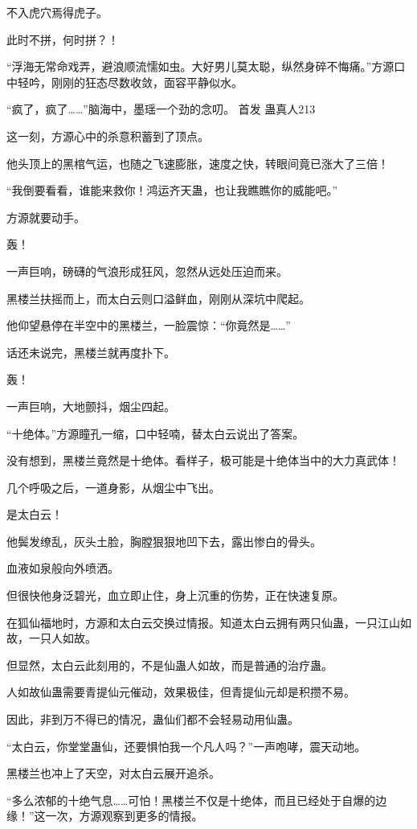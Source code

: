 \begin{this_body}
不入虎穴焉得虎子。

此时不拼，何时拼？！

“浮海无常命戏弄，避浪顺流懦如虫。大好男儿莫太聪，纵然身碎不悔痛。”方源口中轻吟，刚刚的狂态尽数收敛，面容平静似水。

“疯了，疯了……”脑海中，墨瑶一个劲的念叨。  首发 蛊真人213

这一刻，方源心中的杀意积蓄到了顶点。

他头顶上的黑棺气运，也随之飞速膨胀，速度之快，转眼间竟已涨大了三倍！

“我倒要看看，谁能来救你！鸿运齐天蛊，也让我瞧瞧你的威能吧。”

方源就要动手。

轰！

一声巨响，磅礴的气浪形成狂风，忽然从远处压迫而来。

黑楼兰扶摇而上，而太白云则口溢鲜血，刚刚从深坑中爬起。

他仰望悬停在半空中的黑楼兰，一脸震惊：“你竟然是……”

话还未说完，黑楼兰就再度扑下。

轰！

一声巨响，大地颤抖，烟尘四起。

“十绝体。”方源瞳孔一缩，口中轻喃，替太白云说出了答案。

没有想到，黑楼兰竟然是十绝体。看样子，极可能是十绝体当中的大力真武体！

几个呼吸之后，一道身影，从烟尘中飞出。

是太白云！

他鬓发缭乱，灰头土脸，胸膛狠狠地凹下去，露出惨白的骨头。

血液如泉般向外喷洒。

但很快他身泛碧光，血立即止住，身上沉重的伤势，正在快速复原。

在狐仙福地时，方源和太白云交换过情报。知道太白云拥有两只仙蛊，一只江山如故，一只人如故。

但显然，太白云此刻用的，不是仙蛊人如故，而是普通的治疗蛊。

人如故仙蛊需要青提仙元催动，效果极佳，但青提仙元却是积攒不易。

因此，非到万不得已的情况，蛊仙们都不会轻易动用仙蛊。

“太白云，你堂堂蛊仙，还要惧怕我一个凡人吗？”一声咆哮，震天动地。

黑楼兰也冲上了天空，对太白云展开追杀。

“多么浓郁的十绝气息……可怕！黑楼兰不仅是十绝体，而且已经处于自爆的边缘！”这一次，方源观察到更多的情报。


\end{this_body}
